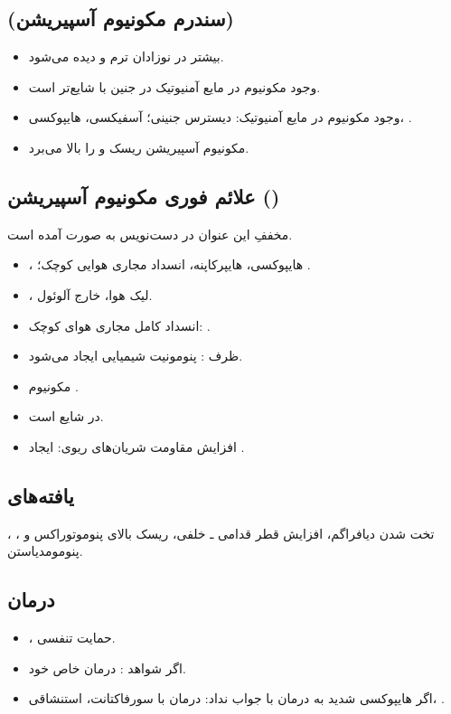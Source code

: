 \documentclass[12pt,a4paper]{article}
\begin{document}
\subsection*{ (سندرم مکونیوم آسپیریشن)}
\begin{itemize}
\item بیشتر در نوزادان ترم و  دیده می‌شود.
\item وجود مکونیوم در مایع آمنیوتیک در جنین با  شایع‌تر است.
\item وجود مکونیوم در مایع آمنیوتیک: دیسترس جنینی؛ آسفیکسی، هایپوکسی، .
\item مکونیوم آسپیریشن ریسک  و  را بالا می‌برد.
\end{itemize}
\subsection*{علائم فوری مکونیوم آسپیریشن ()}
مخففِ این عنوان در دست‌نویس به صورت  آمده است.
\begin{itemize}
\item {}، هایپوکسی، هایپرکاپنه، انسداد مجاری هوایی کوچک؛ .
\item {}، لیک هوا، خارج آلوئول.
\item انسداد کامل مجاری هوای کوچک: .
\item ظرف : پنومونیت شیمیایی ایجاد می‌شود.
\item مکونیوم .
\item {} در  شایع است.
\end{itemize}

\begin{itemize}
\item افزایش مقاومت شریان‌های ریوی: ایجاد .
\end{itemize}
\subsection*{یافته‌های }
، ، تخت شدن دیافراگم، افزایش قطر قدامی ـ خلفی، ریسک بالای پنوموتوراکس و پنومومدیاستن.
\subsection*{درمان}
\begin{itemize}
\item {}، حمایت تنفسی.
\item اگر شواهد : درمان خاص خود.
\item اگر هایپوکسی شدید به درمان با  جواب نداد: درمان با سورفاکتانت،  استنشاقی، .
\end{itemize}
\end{document}
